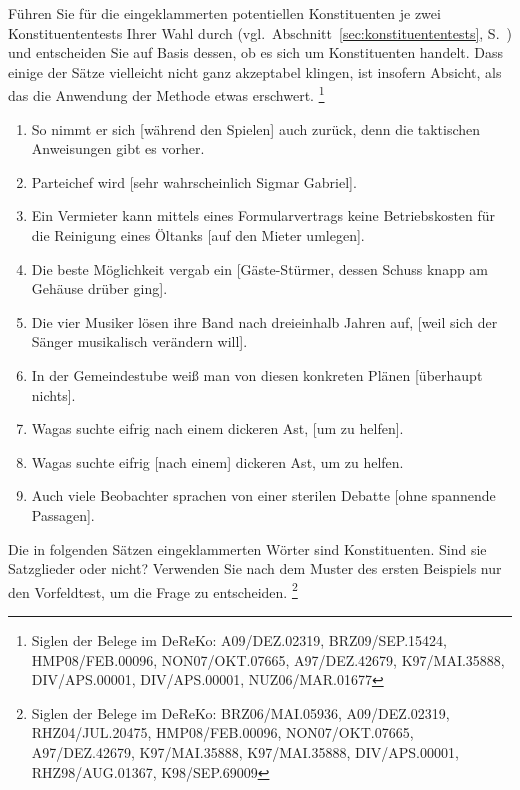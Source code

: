 \Uebungen

 \label{exc:konstituentenstruktur01} Führen Sie für die eingeklammerten potentiellen Konstituenten je zwei Konstituententests Ihrer Wahl durch (vgl.\ Abschnitt~\ref{sec:konstituententests}, S.~\pageref{sec:konstituententests}) und entscheiden Sie auf Basis dessen, ob es sich um Konstituenten handelt.
Dass einige der Sätze vielleicht nicht ganz akzeptabel klingen, ist insofern Absicht, als das die Anwendung der Methode etwas erschwert.%
\footnote{Siglen der Belege im DeReKo: A09\slash DEZ.02319, BRZ09\slash SEP.15424, HMP08\slash FEB.00096, NON07\slash OKT.07665, A97\slash DEZ.42679, K97\slash MAI.35888, DIV\slash APS.00001, DIV\slash APS.00001, NUZ06\slash MAR.01677}

\begin{enumerate}
  \item So nimmt er sich [während den Spielen] auch zurück, denn die taktischen Anweisungen gibt es vorher.
  \item Parteichef wird [sehr wahrscheinlich Sigmar Gabriel].
  \item Ein Vermieter kann mittels eines Formularvertrags keine Betriebskosten für die Reinigung eines Öltanks [auf den Mieter umlegen].
  \item Die beste Möglichkeit vergab ein [Gäste-Stürmer, dessen Schuss knapp am Gehäuse drüber ging].
  \item Die vier Musiker lösen ihre Band nach dreieinhalb Jahren auf, [weil sich der Sänger musikalisch verändern will].
  \item In der Gemeindestube weiß man von diesen konkreten Plänen [überhaupt nichts].
  \item Wagas suchte eifrig nach einem dickeren Ast, [um zu helfen].
  \item Wagas suchte eifrig [nach einem] dickeren Ast, um zu helfen.
  \item Auch viele Beobachter sprachen von einer sterilen Debatte [ohne spannende Passagen].
\end{enumerate}

 \label{exc:konstituentenstruktur02} Die in folgenden Sätzen eingeklammerten Wörter sind Konstituenten.
Sind sie Satzglieder oder nicht?
Verwenden Sie nach dem Muster des ersten Beispiels nur den Vorfeldtest, um die Frage zu entscheiden.%
\footnote{Siglen der Belege im DeReKo: BRZ06\slash MAI.05936, A09\slash DEZ.02319, RHZ04\slash JUL.20475, HMP08\slash FEB.00096, NON07\slash OKT.07665, A97\slash DEZ.42679, K97\slash MAI.35888, K97\slash MAI.35888, DIV\slash APS.00001, RHZ98\slash AUG.01367, K98\slash SEP.69009}

